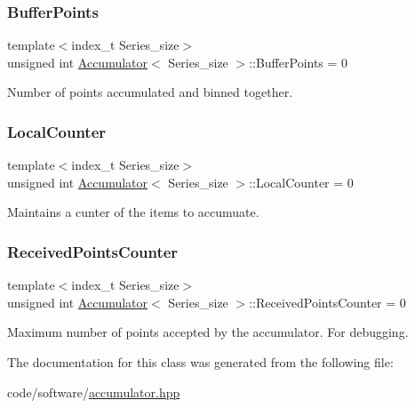 \subsubsection{\texorpdfstring{Buffer\+Points}{BufferPoints}}
{\footnotesize\ttfamily template$<$index\+\_\+t Series\+\_\+size$>$ \\
unsigned int \hyperlink{classAccumulator}{Accumulator}$<$ Series\+\_\+size $>$\+::Buffer\+Points = 0}



Number of points accumulated and binned together. 

\mbox{\label{classAccumulator_a3eca18da4beff6509551889f43e07633}} 
\subsubsection{\texorpdfstring{Local\+Counter}{LocalCounter}}
{\footnotesize\ttfamily template$<$index\+\_\+t Series\+\_\+size$>$ \\
unsigned int \hyperlink{classAccumulator}{Accumulator}$<$ Series\+\_\+size $>$\+::Local\+Counter = 0\hspace{0.3cm}{\ttfamily [private]}}



Maintains a cunter of the items to accumuate. 

\mbox{\label{classAccumulator_a7c73ca34e36c1bf882aebe96187f30bb}} 
\subsubsection{\texorpdfstring{Received\+Points\+Counter}{ReceivedPointsCounter}}
{\footnotesize\ttfamily template$<$index\+\_\+t Series\+\_\+size$>$ \\
unsigned int \hyperlink{classAccumulator}{Accumulator}$<$ Series\+\_\+size $>$\+::Received\+Points\+Counter = 0\hspace{0.3cm}{\ttfamily [private]}}



Maximum number of points accepted by the accumulator. For debugging. 



The documentation for this class was generated from the following file\+:\begin{DoxyCompactItemize}
\item 
code/software/\hyperlink{accumulator_8hpp}{accumulator.\+hpp}\end{DoxyCompactItemize}
